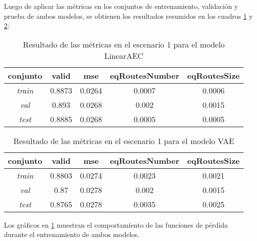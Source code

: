 Luego de aplicar las métricas en los conjuntos de entrenamiento, validación y prueba de ambos modelos, se obtienen los resultados resumidos en los cuadros \ref{case1AEC} y \ref{case1VAE}:

\begin{table}[!h]
	\centering
	\caption{Resultado de las métricas en el escenario 1 para el modelo LinearAEC}
	\begin{tabular}{|c|c|c|c|c|}
		\hline
		\textbf{conjunto} & \textbf{ valid} & \textbf{mse} & \textbf{eqRoutesNumber} & \textbf{eqRoutesSize}  \\
		\hline
		\textit{train} & 0.8873 & 0.0264 & 0.0007 & 0.0006 \\
		\hline
		\textit{val} & 0.893 & 0.0268 & 0.002 & 0.0015 \\
		\hline
		\textit{test} & 0.8885 & 0.0268 & 0.0005 & 0.0005 \\
		\hline
		
	\end{tabular}
	\label{case1AEC}
\end{table}

\begin{table}[!h]
	\centering
	\caption{Resultado de las métricas en el escenario 1 para el modelo VAE}
	\begin{tabular}{|c|c|c|c|c|}
		\hline
		\textbf{conjunto} & \textbf{ valid} & \textbf{mse} & \textbf{eqRoutesNumber} & \textbf{eqRoutesSize}  \\
		\hline
		\textit{train} & 0.8803 & 0.0274 & 0.0023 & 0.0021 \\
		\hline
		\textit{val} & 0.87 & 0.0278 & 0.002 & 0.0015 \\
		\hline
		\textit{test} & 0.8765 & 0.0278 & 0.0035 & 0.0025 \\
		\hline
		
	\end{tabular}
	\label{case1VAE}
\end{table}

Los gráficos en \ref{loss_case1} muestran el comportamiento de las funciones de pérdida durante el entrenamiento de ambos modelos.

\begin{figure}[!h]
	\label{loss_case1}
\end{figure}



